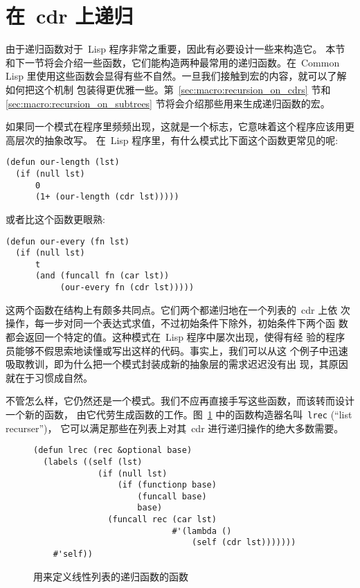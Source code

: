 \section{在~cdr 上递归}
\label{sec:function:recursion_on_cdrs}

由于递归函数对于~Lisp 程序非常之重要，因此有必要设计一些\utility{}{}来构造它。
本节和下一节将会介绍一些函数，它们能构造两种最常用的递归函数。在~Common Lisp
里使用这些函数会显得有些不自然。一旦我们接触到宏的内容，就可以了解如何把这个机制
包装得更优雅一些。第~\ref{sec:macro:recursion_on_cdrs} 节和~
\ref{sec:macro:recursion_on_subtrees} 节将会介绍那些用来生成递归函数的宏。

如果同一个模式在程序里频频出现，这就是一个标志，它意味着这个程序应该用更高层次的抽象改写。
在~Lisp 程序里，有什么模式比下面这个函数更常见的呢:
\begin{lstlisting}
(defun our-length (lst)
  (if (null lst)
      0
      (1+ (our-length (cdr lst)))))
\end{lstlisting}
或者比这个函数更眼熟:
\begin{lstlisting}
(defun our-every (fn lst)
  (if (null lst)
      t
      (and (funcall fn (car lst))
           (our-every fn (cdr lst)))))
\end{lstlisting}
这两个函数在结构上有颇多共同点。它们两个都递归地在一个列表的~cdr 上依
次操作，每一步对同一个表达式求值，不过初始条件下除外，初始条件下两个函
数都会返回一个特定的值。这种模式在~Lisp 程序中屡次出现，使得有经
验的程序员能够不假思索地读懂或写出这样的代码。事实上，我们可以从这
个例子中迅速吸取教训，即为什么把一个模式封装成新的抽象层的需求迟迟没有出
现，其原因就在于习惯成自然。

不管怎么样，它仍然还是一个模式。我们不应再直接手写这些函数，而该转而设计一个新的函数，
由它代劳生成函数的工作。图~\ref{fig:function_to_define_flat_list_recursers} 
中的函数构造器名叫~\texttt{lrec} (``list recurser'')，
它可以满足那些在列表上对其~cdr 进行递归操作的绝大多数需要。
\begin{figure}
\begin{lstlisting}
(defun lrec (rec &optional base)
  (labels ((self (lst)
             (if (null lst)
                 (if (functionp base)
                     (funcall base)
                     base)
               (funcall rec (car lst)
                            #'(lambda ()
                                (self (cdr lst)))))))
    #'self))
\end{lstlisting}
\caption{\label{fig:function_to_define_flat_list_recursers}用来定义线性列表的递归函数的函数}
\end{figure}

